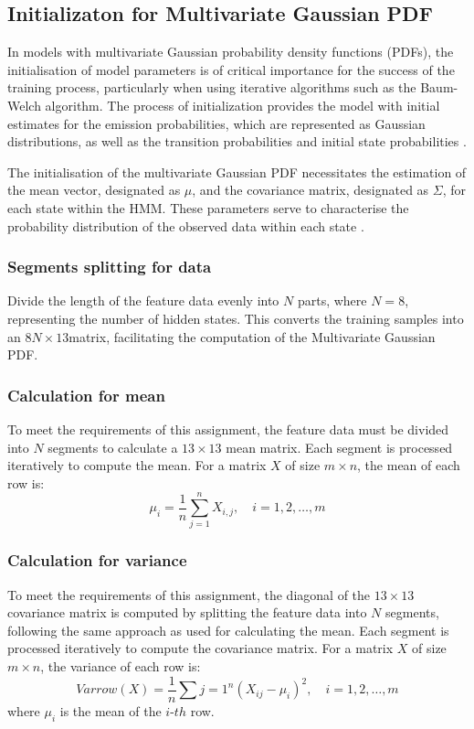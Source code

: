 \documentclass{article}
\begin{document}
\subsection{Initializaton for Multivariate Gaussian PDF}

In models with multivariate Gaussian probability density functions (PDFs), the initialisation of model parameters is of critical importance for the success of the training process, particularly when using iterative algorithms such as the Baum-Welch algorithm. The process of initialization provides the model with initial estimates for the emission probabilities, which are represented as Gaussian distributions, as well as the transition probabilities and initial state probabilities \citep{HTK}.

The initialisation of the multivariate Gaussian PDF necessitates the estimation of the mean vector, designated as $\mu$, and the covariance matrix, designated as $\Sigma$, for each state within the HMM. These parameters serve to characterise the probability distribution of the observed data within each state \citep{EEEM030}.

\subsubsection{Segments splitting for data}
Divide the length of the feature data evenly into $N$ parts, where $N = 8$, representing the number of hidden states. This converts the training samples into an $8N\times13$matrix, facilitating the computation of the Multivariate Gaussian PDF.

\subsubsection{Calculation for mean}
To meet the requirements of this assignment, the feature data must be divided into $N$ segments to calculate a $13\times13$ mean matrix. Each segment is processed iteratively to compute the mean. For a matrix $X$ of size $m \times n$, the mean of each row is:
\begin{equation}	
\mu_i = \frac{1}{n} \sum_{j=1}^{n} X_{i,j}, \quad i = 1, 2, \ldots, m
\end{equation}

\subsubsection{Calculation for variance}
To meet the requirements of this assignment, the diagonal of the $13\times13$ covariance matrix is computed by splitting the feature data into $N$ segments, following the same approach as used for calculating the mean. Each segment is processed iteratively to compute the covariance matrix. For a matrix $X$ of size $m \times n$, the variance of each row is:
\begin{equation}	
Varrow(X) = \frac{1}{n} \sum{j=1}^n \left(X_{ij} - \mu_i\right)^2, \quad i = 1, 2, \dots, m
\end{equation}
where $\mu_i$ is the mean of the $i$-$th$ row.
\end{document}
